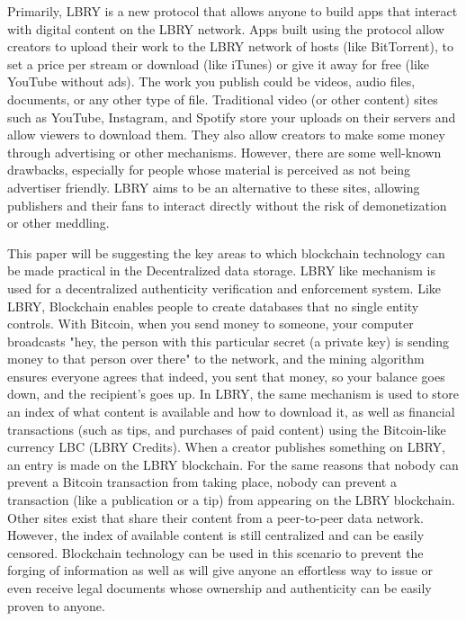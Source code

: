 \documentclass[conference]{IEEEtran}
\begin{document}
Primarily, LBRY is a new protocol that allows anyone to build apps that interact with digital content on the LBRY network. Apps built using the protocol allow creators to upload their work to the LBRY network of hosts (like BitTorrent), to set a price per stream or download (like iTunes) or give it away for free (like YouTube without ads). The work you publish could be videos, audio files, documents, or any other type of file. Traditional video (or other content) sites such as YouTube, Instagram, and Spotify store your uploads on their servers and allow viewers to download them. They also allow creators to make some money through advertising or other mechanisms. However, there are some well-known drawbacks, especially for people whose material is perceived as not being advertiser friendly. LBRY aims to be an alternative to these sites, allowing publishers and their fans to interact directly without the risk of demonetization or other meddling. 

This paper will be suggesting the key areas to which blockchain technology can be made practical in the Decentralized data storage. LBRY like mechanism is used for a decentralized authenticity verification and enforcement system. Like LBRY, Blockchain enables people to create databases that no single entity controls. With Bitcoin, when you send money to someone, your computer broadcasts "hey, the person with this particular secret (a private key) is sending money to that person over there" to the network, and the mining algorithm ensures everyone agrees that indeed, you sent that money, so your balance goes down, and the recipient's goes up. In LBRY, the same mechanism is used to store an index of what content is available and how to download it, as well as financial transactions (such as tips, and purchases of paid content) using the Bitcoin-like currency LBC (LBRY Credits). When a creator publishes something on LBRY, an entry is made on the LBRY blockchain. For the same reasons that nobody can prevent a Bitcoin transaction from taking place, nobody can prevent a transaction (like a publication or a tip) from appearing on the LBRY blockchain. Other sites exist that share their content from a peer-to-peer data network. However, the index of available content is still centralized and can be easily censored. Blockchain technology can be used in this scenario to prevent the forging of information as well as will give anyone an effortless way to issue or even receive legal documents whose ownership and authenticity can be easily proven to anyone. 
\end{document}

